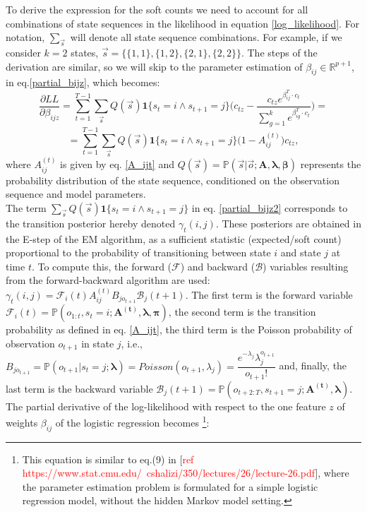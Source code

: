 \documentclass{article}
\begin{document}
To derive the expression for the soft counts we need to account for all combinations of state sequences in the likelihood in equation \eqref{log_likelihood}. For notation, $\sum_{\Vec{s}}$ will denote all state sequence combinations. For example, if we consider $k=2$ states, $\Vec{s}=\{ \{1,1\}, \{1,2\}, \{2,1\}, \{2,2\}\}$. The steps of the derivation are similar, so we will skip to the parameter estimation of $\beta_{ij}\in \mathbb{R}^{p+1}$, in eq.\eqref{partial_bijz}, which becomes:
\[\dfrac{\partial LL}{\partial \beta_{ijz}} = \sum_{t=1}^{T-1} \sum_{\Vec{s}} Q(\Vec{s}) \textbf{1}\{s_{t}=i\wedge s_{t+1}=j\} \Bigg(c_{tz} - \dfrac{c_{tz}e^{\beta_{ij}^T \cdot c_t}}{\sum_{g=1}^k  e^{\beta_{ig}^T \cdot c_t}} \Bigg) =\]
\begin{equation}
    =\sum_{t=1}^{T-1} \sum_{\Vec{s}} Q(\Vec{s}) \textbf{1}\{s_{t}=i\wedge s_{t+1}=j\} \Bigg(1 -  A_{ij}^{(t)} \Bigg)c_{tz},
    \label{partial_bijz2}
\end{equation}
where $A_{ij}^{(t)}$ is given by eq. \eqref{A_ijt} and $Q(\Vec{s})=\mathbb{P}(\Vec{s}|\Vec{o}; \boldsymbol{A}, \boldsymbol{\lambda}, \boldsymbol{\beta})$ represents the probability distribution of the state sequence, conditioned on the observation sequence and model parameters. \\ \noindent
The term $\sum_{\Vec{s}} Q(\Vec{s}) \textbf{1}\{s_{t}=i\wedge s_{t+1}=j\}$ in eq. \eqref{partial_bijz2} corresponds to the transition posterior hereby denoted $\gamma_t(i,j)$. These posteriors are obtained in the E-step of the EM algorithm, as a sufficient statistic (expected/soft count) proportional to the probability of transitioning between state $i$ and state $j$ at time $t$. To compute this, the forward ($\mathcal{F}$) and backward ($\mathcal{B}$) variables resulting from the forward-backward algorithm are used: $\gamma_t(i,j) = \mathcal{F}_i(t)A_{ij}^{(t)} B_{jo_{t+1}} \mathcal{B}_j(t+1)$.
The first term is the forward variable $\mathcal{F}_i(t) = \mathbb{P}(o_{1:t}, s_t=i; \boldsymbol{A^{(t)}}, \boldsymbol{\lambda}, \boldsymbol{\pi})$, the second term is the transition probability as defined in eq. \eqref{A_ijt}, the third term is the Poisson probability of observation $o_{t+1}$ in state $j$, i.e., $B_{jo_{t+1}} = \mathbb{P}(o_{t+1}|s_t=j; \boldsymbol{\lambda})=Poisson(o_{t+1},\lambda_j)=\dfrac{e^{-\lambda_j} \lambda_j^{o_{t+1}}}{o_{t+1}!}$ and, finally, the last term is the backward variable $\mathcal{B}_j(t+1) = \mathbb{P}(o_{t+2:T}, s_{t+1}=j;\boldsymbol{A^{(t)}}, \boldsymbol{\lambda})$.
The partial derivative of the log-likelihood with respect to the one feature $z$ of weights $\beta_{ij}$ of the logistic regression becomes \footnote{This equation is similar to eq.(9) in [\textcolor{red}{ref https://www.stat.cmu.edu/~cshalizi/350/lectures/26/lecture-26.pdf}], where the parameter estimation problem is formulated for a simple logistic regression model, without the hidden Markov model setting.}:
\end{document}
